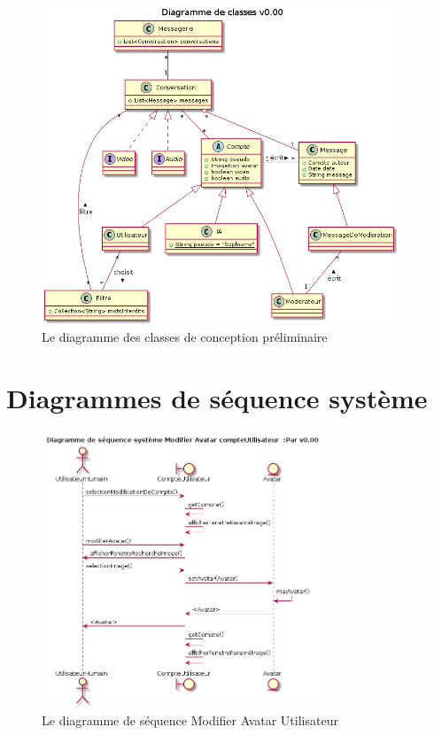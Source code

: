 \documentclass[11pt,dvipsnames,svgnames]{report}
\begin{document}
\begin{figure}[H]
\centerline{\includegraphics[width=0.95\textwidth]{diagrammes/class-diag.png}}
\caption{Le diagramme des classes de conception préliminaire}
\end{figure}

\section{Diagrammes de séquence système}

\begin{figure}[H]
\centerline{\includegraphics[width=0.75\textwidth]{diagrammes/Avatar-DSS.png}}
\caption{Le diagramme de séquence \og Modifier Avatar Utilisateur \fg}
\end{figure}
\end{document}

